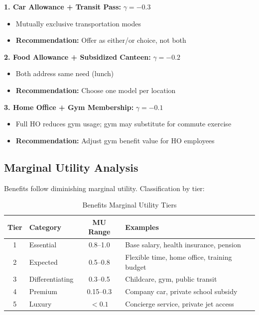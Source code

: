 \begin{tcolorbox}[colback=red!5!white,colframe=red!75!black,title=\textbf{Benefit Pairs to Avoid Combining}]

\textbf{1. Car Allowance + Transit Pass:} $\gamma = -0.3$
\begin{itemize}[noitemsep]
    \item Mutually exclusive transportation modes
    \item \textbf{Recommendation:} Offer as either/or choice, not both
\end{itemize}

\textbf{2. Food Allowance + Subsidized Canteen:} $\gamma = -0.2$
\begin{itemize}[noitemsep]
    \item Both address same need (lunch)
    \item \textbf{Recommendation:} Choose one model per location
\end{itemize}

\textbf{3. Home Office + Gym Membership:} $\gamma = -0.1$
\begin{itemize}[noitemsep]
    \item Full HO reduces gym usage; gym may substitute for commute exercise
    \item \textbf{Recommendation:} Adjust gym benefit value for HO employees
\end{itemize}

\end{tcolorbox}

\subsection{Marginal Utility Analysis}
\label{subsec:marginal-utility}

Benefits follow diminishing marginal utility. Classification by tier:

\begin{table}[htbp]
\centering
\caption{Benefits Marginal Utility Tiers}
\label{tab:benefits-mu-tiers}
\renewcommand{\arraystretch}{1.3}
\begin{tabular}{@{}clcp{5cm}@{}}
\toprule
\textbf{Tier} & \textbf{Category} & \textbf{MU Range} & \textbf{Examples} \\
\midrule
1 & Essential & 0.8--1.0 & Base salary, health insurance, pension \\
2 & Expected & 0.5--0.8 & Flexible time, home office, training budget \\
3 & Differentiating & 0.3--0.5 & Childcare, gym, public transit \\
4 & Premium & 0.15--0.3 & Company car, private school subsidy \\
5 & Luxury & $<0.1$ & Concierge service, private jet access \\
\bottomrule
\end{tabular}
\end{table}

